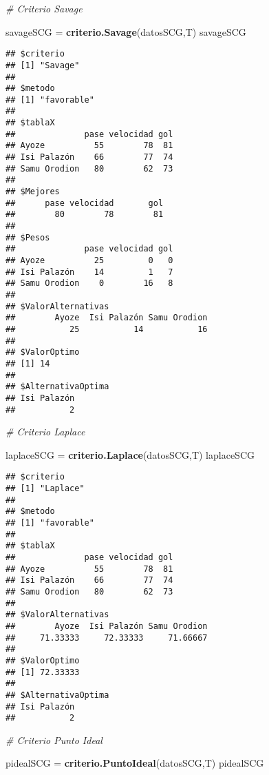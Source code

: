 \documentclass[
]{article}
\newenvironment{Shaded}{\begin{snugshade}}{\end{snugshade}}
\newcommand{\CommentTok}[1]{\textcolor[rgb]{0.56,0.35,0.01}{\textit{#1}}}
\newcommand{\FunctionTok}[1]{\textcolor[rgb]{0.13,0.29,0.53}{\textbf{#1}}}
\newcommand{\NormalTok}[1]{#1}
\newcommand{\OtherTok}[1]{\textcolor[rgb]{0.56,0.35,0.01}{#1}}
\begin{document}
\begin{Shaded}
\begin{Highlighting}[]
\CommentTok{\# Criterio Savage}

\NormalTok{savageSCG }\OtherTok{=} \FunctionTok{criterio.Savage}\NormalTok{(datosSCG,T)}
\NormalTok{savageSCG}
\end{Highlighting}
\end{Shaded}

\begin{verbatim}
## $criterio
## [1] "Savage"
## 
## $metodo
## [1] "favorable"
## 
## $tablaX
##              pase velocidad gol
## Ayoze          55        78  81
## Isi Palazón    66        77  74
## Samu Orodion   80        62  73
## 
## $Mejores
##      pase velocidad       gol 
##        80        78        81 
## 
## $Pesos
##              pase velocidad gol
## Ayoze          25         0   0
## Isi Palazón    14         1   7
## Samu Orodion    0        16   8
## 
## $ValorAlternativas
##        Ayoze  Isi Palazón Samu Orodion 
##           25           14           16 
## 
## $ValorOptimo
## [1] 14
## 
## $AlternativaOptima
## Isi Palazón 
##           2
\end{verbatim}

\begin{Shaded}
\begin{Highlighting}[]
\CommentTok{\# Criterio Laplace}

\NormalTok{laplaceSCG }\OtherTok{=} \FunctionTok{criterio.Laplace}\NormalTok{(datosSCG,T)}
\NormalTok{laplaceSCG}
\end{Highlighting}
\end{Shaded}

\begin{verbatim}
## $criterio
## [1] "Laplace"
## 
## $metodo
## [1] "favorable"
## 
## $tablaX
##              pase velocidad gol
## Ayoze          55        78  81
## Isi Palazón    66        77  74
## Samu Orodion   80        62  73
## 
## $ValorAlternativas
##        Ayoze  Isi Palazón Samu Orodion 
##     71.33333     72.33333     71.66667 
## 
## $ValorOptimo
## [1] 72.33333
## 
## $AlternativaOptima
## Isi Palazón 
##           2
\end{verbatim}

\begin{Shaded}
\begin{Highlighting}[]
\CommentTok{\# Criterio Punto Ideal}

\NormalTok{pidealSCG }\OtherTok{=} \FunctionTok{criterio.PuntoIdeal}\NormalTok{(datosSCG,T)}
\NormalTok{pidealSCG}
\end{Highlighting}
\end{Shaded}
\end{document}
